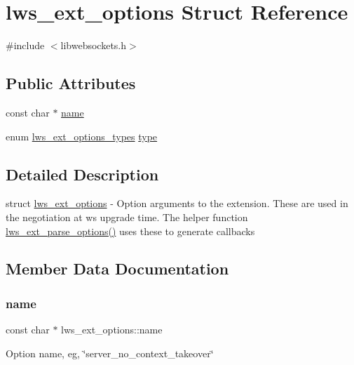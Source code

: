 \hypertarget{structlws__ext__options}{}\section{lws\+\_\+ext\+\_\+options Struct Reference}
\label{structlws__ext__options}


{\ttfamily \#include $<$libwebsockets.\+h$>$}

\subsection*{Public Attributes}
\begin{DoxyCompactItemize}
\item 
const char $\ast$ \hyperlink{structlws__ext__options_ab7c0bd70b61cb668195271680942387f}{name}
\item 
enum \hyperlink{group__extensions_gacc9f55936dc165257a2e1f7d47bce89e}{lws\+\_\+ext\+\_\+options\+\_\+types} \hyperlink{structlws__ext__options_a7c4dbd62dbeba63a9d50d2306bd1cc61}{type}
\end{DoxyCompactItemize}


\subsection{Detailed Description}
struct \hyperlink{structlws__ext__options}{lws\+\_\+ext\+\_\+options} -\/ Option arguments to the extension. These are used in the negotiation at ws upgrade time. The helper function \hyperlink{group__extensions_ga6fb3e2c3dfb9d64dc87026a4e99c128b}{lws\+\_\+ext\+\_\+parse\+\_\+options()} uses these to generate callbacks 

\subsection{Member Data Documentation}
\mbox{\label{structlws__ext__options_ab7c0bd70b61cb668195271680942387f}} 
\subsubsection{\texorpdfstring{name}{name}}
{\footnotesize\ttfamily const char $\ast$ lws\+\_\+ext\+\_\+options\+::name}

Option name, eg, \char`\"{}server\+\_\+no\+\_\+context\+\_\+takeover\char`\"{} \mbox{\label{structlws__ext__options_a7c4dbd62dbeba63a9d50d2306bd1cc61}} 
